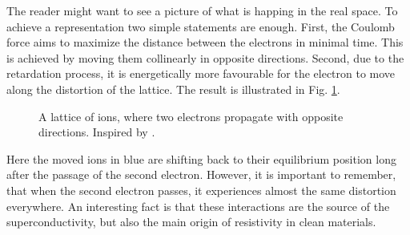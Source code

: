 \documentclass[../main.tex]{subfile}
\begin{document}
The reader might want to see a picture of what is happing in the real space. To achieve a representation two simple statements are enough. 
First, the Coulomb force aims to maximize the distance between the electrons in minimal time.
 This is achieved by moving them collinearly in opposite directions. Second, due to the retardation process, it is energetically more favourable
for the electron to move along the distortion of the lattice. The result is illustrated in Fig. \ref{fig:CooperPairing}. 
\begin{figure}[H]
    
    \centering
    \caption{A lattice of ions, where two electrons propagate with opposite directions. Inspired by \cite{FossheimSudbo2004}.} \label{fig:CooperPairing}
\end{figure}
Here the moved ions in blue are shifting back to their equilibrium position long after the passage of the second electron.
However, it is important to remember, that when the second electron passes, it experiences almost the same distortion everywhere.
An interesting fact is that these interactions are the source of the superconductivity, but also the main origin of resistivity in clean materials.
    
\end{document}
